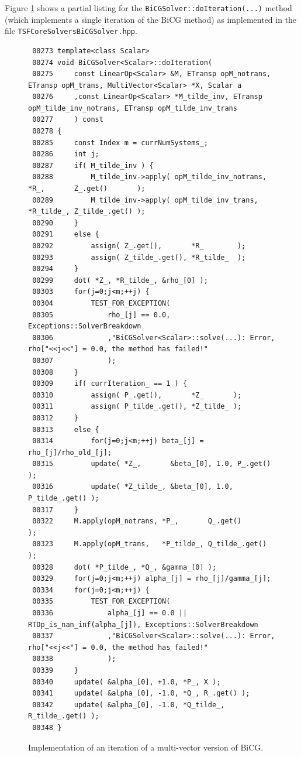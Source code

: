 Figure \ref{tsfcore:fig:BiCG_code} shows a partial listing for the
\texttt{BiCGSolver\-::doIteration(...)} method (which implements
a single iteration of the BiCG method) as implemented in the file
\texttt{TSFCore\-Solvers\-BiCG\-Solver.hpp}.
%
{\bsinglespace
\begin{figure}
\begin{minipage}{\textwidth}
{\scriptsize\begin{verbatim}
 00273 template<class Scalar>
 00274 void BiCGSolver<Scalar>::doIteration(
 00275     const LinearOp<Scalar> &M, ETransp opM_notrans, ETransp opM_trans, MultiVector<Scalar> *X, Scalar a
 00276     ,const LinearOp<Scalar> *M_tilde_inv, ETransp opM_tilde_inv_notrans, ETransp opM_tilde_inv_trans
 00277     ) const
 00278 {
 00285     const Index m = currNumSystems_;
 00286     int j;
 00287     if( M_tilde_inv ) {
 00288         M_tilde_inv->apply( opM_tilde_inv_notrans, *R_,       Z_.get()       );
 00289         M_tilde_inv->apply( opM_tilde_inv_trans,   *R_tilde_, Z_tilde_.get() );
 00290     }
 00291     else {
 00292         assign( Z_.get(),       *R_        );
 00293         assign( Z_tilde_.get(), *R_tilde_  );
 00294     }
 00299     dot( *Z_, *R_tilde_, &rho_[0] );
 00303     for(j=0;j<m;++j) {
 00304         TEST_FOR_EXCEPTION(
 00305             rho_[j] == 0.0, Exceptions::SolverBreakdown
 00306             ,"BiCGSolver<Scalar>::solve(...): Error, rho["<<j<<"] = 0.0, the method has failed!"
 00307             );
 00308     }
 00309     if( currIteration_ == 1 ) {
 00310         assign( P_.get(),       *Z_       );
 00311         assign( P_tilde_.get(), *Z_tilde_ );
 00312     }
 00313     else {
 00314         for(j=0;j<m;++j) beta_[j] = rho_[j]/rho_old_[j];
 00315         update( *Z_,       &beta_[0], 1.0, P_.get()       );
 00316         update( *Z_tilde_, &beta_[0], 1.0, P_tilde_.get() );
 00317     }
 00322     M.apply(opM_notrans, *P_,       Q_.get()       );
 00323     M.apply(opM_trans,   *P_tilde_, Q_tilde_.get() );
 00328     dot( *P_tilde_, *Q_, &gamma_[0] );
 00329     for(j=0;j<m;++j) alpha_[j] = rho_[j]/gamma_[j];
 00334     for(j=0;j<m;++j) {
 00335         TEST_FOR_EXCEPTION(
 00336             alpha_[j] == 0.0 || RTOp_is_nan_inf(alpha_[j]), Exceptions::SolverBreakdown
 00337             ,"BiCGSolver<Scalar>::solve(...): Error, rho["<<j<<"] = 0.0, the method has failed!"
 00338             );
 00339     }
 00340     update( &alpha_[0], +1.0, *P_, X );
 00341     update( &alpha_[0], -1.0, *Q_, R_.get() );
 00342     update( &alpha_[0], -1.0, *Q_tilde_, R_tilde_.get() );
 00348 }
\end{verbatim}}
\end{minipage}
\caption{
\label{tsfcore:fig:BiCG_code}
Implementation of an iteration of a multi-vector version of BiCG.
}
\end{figure}
\esinglespace}
